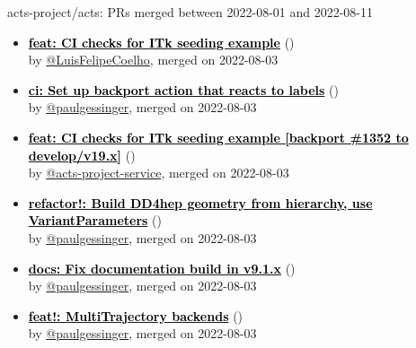 \begin{frame}[allowframebreaks]{ acts-project/acts: PRs merged 
between 2022-08-01 and 2022-08-11
}
\begin{itemize}
    \item\prmerged\textbf{\href{https://github.com/acts-project/acts/pull/1352}{\textcolor{black}{feat: CI checks for ITk seeding example}}}
    (\href{https://github.com/acts-project/acts/pull/1352}{}) \\
    by \href{https://github.com/LuisFelipeCoelho}{@LuisFelipeCoelho}, merged on 2022-08-03

    \item\prmerged\textbf{\href{https://github.com/acts-project/acts/pull/1365}{\textcolor{black}{ci: Set up backport action that reacts to labels}}}
    (\href{https://github.com/acts-project/acts/pull/1365}{}) \\
    by \href{https://github.com/paulgessinger}{@paulgessinger}, merged on 2022-08-03

    \item\prmerged\textbf{\href{https://github.com/acts-project/acts/pull/1366}{\textcolor{black}{feat: CI checks for ITk seeding example [backport \#1352 to develop/v19.x]}}}
    (\href{https://github.com/acts-project/acts/pull/1366}{}) \\
    by \href{https://github.com/acts-project-service}{@acts-project-service}, merged on 2022-08-03

    \item\prmerged\textbf{\href{https://github.com/acts-project/acts/pull/1257}{\textcolor{black}{refactor!: Build DD4hep geometry from hierarchy, use VariantParameters}}}
    (\href{https://github.com/acts-project/acts/pull/1257}{}) \\
    by \href{https://github.com/paulgessinger}{@paulgessinger}, merged on 2022-08-03

    \item\prmerged\textbf{\href{https://github.com/acts-project/acts/pull/1369}{\textcolor{black}{docs: Fix documentation build in v9.1.x}}}
    (\href{https://github.com/acts-project/acts/pull/1369}{}) \\
    by \href{https://github.com/paulgessinger}{@paulgessinger}, merged on 2022-08-03

    \item\prmerged\textbf{\href{https://github.com/acts-project/acts/pull/1262}{\textcolor{black}{feat!: MultiTrajectory backends}}}
    (\href{https://github.com/acts-project/acts/pull/1262}{}) \\
    by \href{https://github.com/paulgessinger}{@paulgessinger}, merged on 2022-08-03


\end{itemize}
\end{frame}

